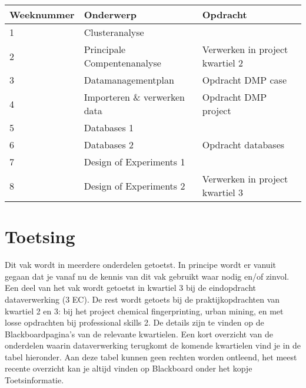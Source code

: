 \begin{table}[h]
\begin{tabular}{|l|l|l|}
\hline
\rowcolor{saxion}
Weeknummer & Onderwerp                    & Opdracht                         \\ \hline
1          & Clusteranalyse               &                                  \\ \hline
2          & Principale Compentenanalyse  & Verwerken in project kwartiel 2 \\ \hline
\rowcolor[HTML]{C0C0C0} 
3          & Datamanagementplan           & Opdracht DMP case                                  \\ \hline
\rowcolor[HTML]{C0C0C0} 
4          & Importeren \& verwerken data & Opdracht DMP project             \\ \hline
5          & Databases 1                  &                                  \\ \hline
6          & Databases 2                  & Opdracht databases               \\ \hline
\rowcolor[HTML]{C0C0C0} 
7          & Design of Experiments 1      &                                  \\ \hline
\rowcolor[HTML]{C0C0C0} 
8          & Design of Experiments 2      & Verwerken in project kwartiel 3 \\ \hline
\end{tabular}
\end{table}


\section{Toetsing}

Dit vak wordt in meerdere onderdelen getoetst. In principe wordt er vanuit gegaan dat je vanaf nu de kennis van dit vak gebruikt waar nodig en/of zinvol. Een deel van het vak wordt getoetst in kwartiel 3 bij de eindopdracht dataverwerking (3 EC). De rest wordt getoets bij de praktijkopdrachten van kwartiel 2 en 3: bij het project chemical fingerprinting, urban mining, en met losse opdrachten bij professional skills 2. De details zijn te vinden op de Blackboardpagina's van de relevante kwartielen. Een kort overzicht van de onderdelen waarin dataverwerking terugkomt de komende kwartielen vind je in de tabel hieronder. Aan deze tabel kunnen geen rechten worden ontleend, het meest recente overzicht kan je altijd vinden op Blackboard onder het kopje Toetsinformatie.

